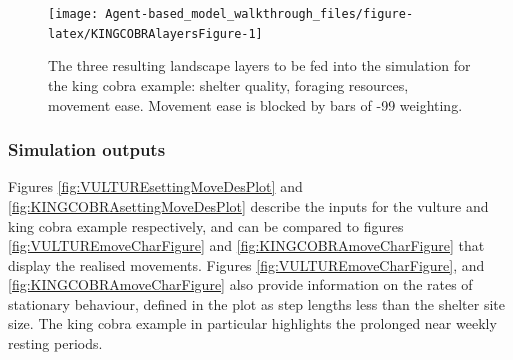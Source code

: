 \documentclass[10pt,a4paper]{article}
\begin{document}
\begin{figure}

{\centering \texttt{[image: Agent-based\_model\_walkthrough\_files/figure-latex/KINGCOBRAlayersFigure-1]} 

}

\caption{The three resulting landscape layers to be fed into the simulation for the king cobra example: shelter quality, foraging resources, movement ease. Movement ease is blocked by bars of -99 weighting.}\label{fig:KINGCOBRAlayersFigure}
\end{figure}

\clearpage

\hypertarget{simulation-outputs}{%
\subsubsection{Simulation outputs}\label{simulation-outputs}}

Figures \ref{fig:VULTUREsettingMoveDesPlot} and \ref{fig:KINGCOBRAsettingMoveDesPlot} describe the inputs for the vulture and king cobra example respectively, and can be compared to figures \ref{fig:VULTUREmoveCharFigure} and \ref{fig:KINGCOBRAmoveCharFigure} that display the realised movements.
Figures \ref{fig:VULTUREmoveCharFigure}, and \ref{fig:KINGCOBRAmoveCharFigure} also provide information on the rates of stationary behaviour, defined in the plot as step lengths less than the shelter site size.
The king cobra example in particular highlights the prolonged near weekly resting periods.
\end{document}
